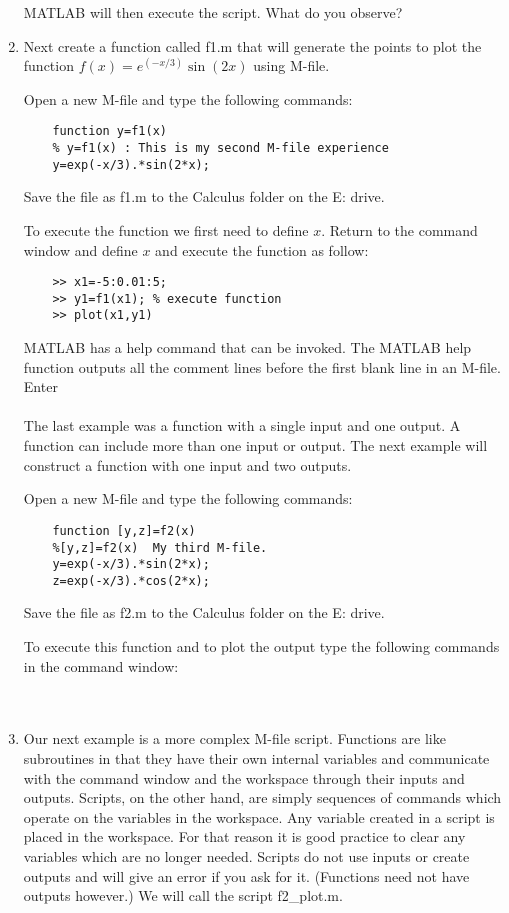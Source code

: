 \begin{enumerate}
  MATLAB will then execute the script.  What do you observe?
  
  \item Next create a function called f1.m that will generate the points to plot
  the function $f(x)=e^{(-x/3)}\sin(2x)$ using M-file.
  
  Open a new M-file and type the following commands:
  \begin{verbatim}
    function y=f1(x)
    % y=f1(x) : This is my second M-file experience
    y=exp(-x/3).*sin(2*x);
  \end{verbatim}
  Save the file as f1.m to the Calculus folder on the E: drive.
  
  To execute the function we first need to define $x$.  Return to the command
  window and define $x$  and execute the function as follow:\\
  \begin{verbatim}
    >> x1=-5:0.01:5;
    >> y1=f1(x1); % execute function
    >> plot(x1,y1)
  \end{verbatim}
  
  MATLAB has a help command that can be invoked.  The MATLAB help function outputs
  all the comment lines before the first blank line in an M-file.  Enter\\
  \\
  The last example was a function with a single input and one output.  A function
  can include more than one input or output.  The next example will construct a
  function with one input and two outputs.
  
  Open a new M-file and type the following commands:
  \begin{verbatim}
    function [y,z]=f2(x)
    %[y,z]=f2(x)  My third M-file.
    y=exp(-x/3).*sin(2*x);
    z=exp(-x/3).*cos(2*x);
  \end{verbatim}
  Save the file as f2.m to the Calculus folder on the E: drive.
  
  To execute this function and to plot the output type the following commands in 
  the command window:\\
  \\
  \\
  
  \item Our next example is a more complex M-file script.  Functions are like
  subroutines in that they have their own internal variables and communicate
  with the command window and the workspace through their inputs and outputs. 
  Scripts, on the other hand, are simply sequences of commands which operate on
  the variables in the workspace.  Any variable created in a script is placed in
  the workspace.  For that reason it is good practice to clear any variables
  which are no longer needed.  Scripts do not use inputs or create outputs and
  will give an error if you ask for it.  (Functions need not have outputs
  however.)  We will call the script f2\_plot.m.
  

\end{enumerate}

